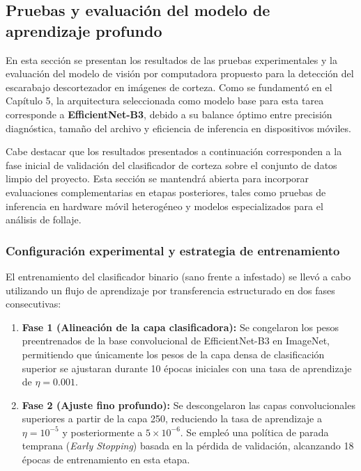 \newpage
\subsection{Pruebas y evaluación del modelo de aprendizaje profundo}
\label{subsec:pruebas-modelo}

En esta sección se presentan los resultados de las pruebas experimentales y la evaluación del modelo de visión por computadora propuesto para la detección del escarabajo descortezador en imágenes de corteza. Como se fundamentó en el Capítulo 5, la arquitectura seleccionada como modelo base para esta tarea corresponde a \textbf{EfficientNet-B3}, debido a su balance óptimo entre precisión diagnóstica, tamaño del archivo y eficiencia de inferencia en dispositivos móviles.

Cabe destacar que los resultados presentados a continuación corresponden a la fase inicial de validación del clasificador de corteza sobre el conjunto de datos limpio del proyecto. Esta sección se mantendrá abierta para incorporar evaluaciones complementarias en etapas posteriores, tales como pruebas de inferencia en hardware móvil heterogéneo y modelos especializados para el análisis de follaje.

\subsubsection{Configuración experimental y estrategia de entrenamiento}
\label{subsubsec:configuracion-entrenamiento}

El entrenamiento del clasificador binario (sano frente a infestado) se llevó a cabo utilizando un flujo de aprendizaje por transferencia estructurado en dos fases consecutivas:

\begin{enumerate}[label=\textbf{\arabic*.}]
    \item \textbf{Fase 1 (Alineación de la capa clasificadora):} Se congelaron los pesos preentrenados de la base convolucional de EfficientNet-B3 en ImageNet, permitiendo que únicamente los pesos de la capa densa de clasificación superior se ajustaran durante 10 épocas iniciales con una tasa de aprendizaje de $\eta = 0.001$.
    \item \textbf{Fase 2 (Ajuste fino profundo):} Se descongelaron las capas convolucionales superiores a partir de la capa 250, reduciendo la tasa de aprendizaje a $\eta = 10^{-5}$ y posteriormente a $5 \times 10^{-6}$. Se empleó una política de parada temprana (\textit{Early Stopping}) basada en la pérdida de validación, alcanzando 18 épocas de entrenamiento en esta etapa.
\end{enumerate}

